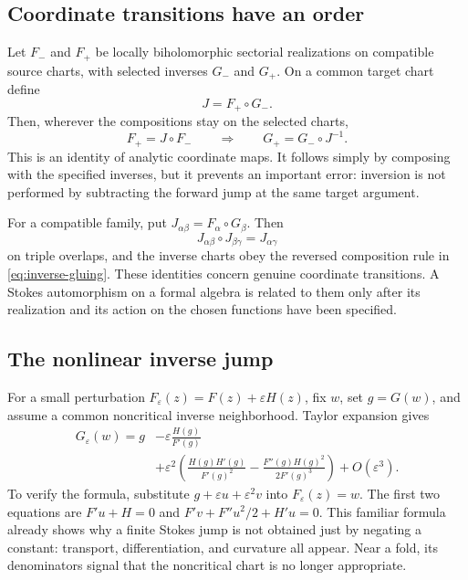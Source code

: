 \documentclass[11pt,a4paper]{article}
\numberwithin{equation}{section}
\theoremstyle{definition}
\theoremstyle{remark}
\begin{document}
\subsection{Coordinate transitions have an order}
Let $F_-$ and $F_+$ be locally biholomorphic sectorial realizations on compatible source charts, with selected inverses $G_-$ and $G_+$. On a common target chart define
\begin{equation}
 J=F_+\circ G_-.
 \label{eq:J}
\end{equation}
Then, wherever the compositions stay on the selected charts,
\begin{equation}
 F_+=J\circ F_-\qquad\Longrightarrow\qquad
 G_+=G_-\circ J^{-1}.
 \label{eq:inverse-gluing}
\end{equation}
This is an identity of analytic coordinate maps. It follows simply by composing with the specified inverses, but it prevents an important error: inversion is not performed by subtracting the forward jump at the same target argument.

For a compatible family, put $J_{\alpha\beta}=F_\alpha\circ G_\beta$. Then
\begin{equation}
 J_{\alpha\beta}\circ J_{\beta\gamma}=J_{\alpha\gamma}
 \label{eq:cocycle}
\end{equation}
on triple overlaps, and the inverse charts obey the reversed composition rule in \eqref{eq:inverse-gluing}. These identities concern genuine coordinate transitions. A Stokes automorphism on a formal algebra is related to them only after its realization and its action on the chosen functions have been specified.

\subsection{The nonlinear inverse jump}
For a small perturbation $F_\varepsilon(z)=F(z)+\varepsilon H(z)$, fix $w$, set $g=G(w)$, and assume a common noncritical inverse neighborhood. Taylor expansion gives
\begin{equation}
 \begin{split}
 G_\varepsilon(w)=g
 &-\varepsilon\frac{H(g)}{F'(g)}\\
 &+\varepsilon^2\left(
       \frac{H(g)H'(g)}{F'(g)^2}
       -\frac{F''(g)H(g)^2}{2F'(g)^3}\right)
 +O(\varepsilon^3).
 \end{split}
 \label{eq:inverse-jump}
\end{equation}
To verify the formula, substitute $g+\varepsilon u+\varepsilon^2v$ into $F_\varepsilon(z)=w$. The first two equations are
$F'u+H=0$ and $F'v+F''u^2/2+H'u=0$. This familiar formula already shows why a finite Stokes jump is not obtained just by negating a constant: transport, differentiation, and curvature all appear. Near a fold, its denominators signal that the noncritical chart is no longer appropriate.
\end{document}
